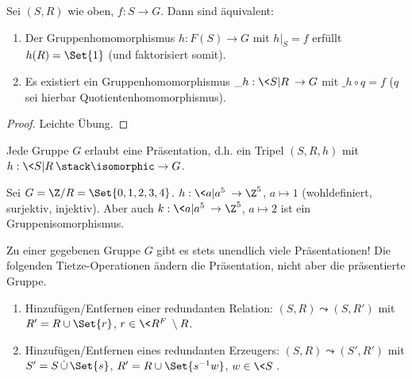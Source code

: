 \begin{st}
    Sei $(S,R)$ wie oben, $f : S \to G$.
    Dann sind äquivalent:
    \begin{enumerate}[1)]
        \item
            Der Gruppenhomomorphismus $h: F(S) \to G$ mit $h|_S = f$ erfüllt $h(R) = \Set{1}$ (und faktorisiert somit).
        \item
            Es existiert ein Gruppenhomomorphismus $\_h: \<S|R\> \to G$ mit $\_h \circ q = f$ ($q$ sei hierbar Quotientenhomomorphismus).
    \end{enumerate}
    \begin{proof}
        Leichte Übung.
    \end{proof}
\end{st}

\begin{prop}
    Jede Gruppe $G$ erlaubt eine Präsentation, d.h. ein Tripel $(S,R,h)$ mit $h: \<S | R\> \stack\isomorphic\to G$.
\end{prop}

\begin{ex}
    Sei $G = \Z / R = \Set{0,1,2,3,4}$.
    $h: \< a | a^5\> \to \Z^5$, $a \mapsto 1$ (wohldefiniert, surjektiv, injektiv).
    Aber auch $k: \<a|a^5\> \to \Z^5$, $a \mapsto 2$ ist ein Gruppenisomorphismus.
\end{ex}

Zu einer gegebenen Gruppe $G$ gibt es stets unendlich viele Präsentationen!
Die folgenden Tietze-Operationen ändern die Präsentation, nicht aber die präsentierte Gruppe.
\begin{enumerate}[(T1)]
    \item
        Hinzufügen/Entfernen einer redundanten Relation: $(S,R) \leadsto (S,R')$ mit $R' = R \cup \Set{r}$, $r \in \<R^F\> \setminus R$.
    \item
        Hinzufügen/Entfernen eines redundanten Erzeugers: $(S,R) \leadsto (S',R')$ mit $S' = S \dotcup \Set{s}$, $R' = R \cup \Set{s^{-1} w}$, $w \in \<S\>$.
\end{enumerate}

